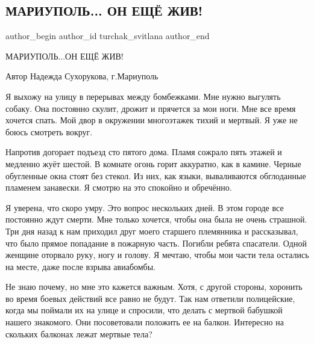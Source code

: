  
 
 
 
 
 
\subsection{МАРИУПОЛЬ... ОН ЕЩЁ ЖИВ!}
\label{sec:20_03_2022.fb.turchak_svitlana.1.mariupol_on_esche_zhyv}
 
\ifcmt
 author_begin
   author_id turchak_svitlana
 author_end
\fi

МАРИУПОЛЬ...ОН ЕЩЁ ЖИВ!

Автор Надежда Сухорукова, г.Мариуполь 

Я выхожу на улицу в перерывах между бомбежками. Мне нужно выгулять собаку. Она
постоянно скулит, дрожит и прячется за мои ноги. Мне все время хочется спать.
Мой двор в окружении многоэтажек тихий и мертвый. Я уже  не боюсь смотреть
вокруг.

Напротив догорает подъезд сто пятого дома. Пламя сожрало пять этажей и медленно
жуёт  шестой. В комнате огонь горит аккуратно, как в камине. Черные обугленные
окна стоят  без стекол. Из них, как языки,  вываливаются обглоданные пламенем
занавески. Я смотрю на это спокойно и обречённо.

Я уверена, что скоро умру. Это вопрос нескольких дней.  В этом  городе все
постоянно ждут  смерти. Мне только хочется, чтобы она была не очень страшной.
Три дня назад к нам приходил друг моего старшего племянника и рассказывал, что
было прямое попадание в пожарную часть. Погибли ребята спасатели. Одной женщине
оторвало руку, ногу и голову. Я мечтаю, чтобы мои части тела остались на месте,
даже после взрыва авиабомбы.  

Не знаю почему, но мне это кажется важным. Хотя, с другой стороны, хоронить во
время боевых действий все равно не будут. Так нам ответили полицейские, когда
мы поймали их на улице и спросили, что делать с мертвой бабушкой нашего
знакомого. Они посоветовали положить ее на балкон. Интересно на скольких
балконах лежат мертвые тела? 

